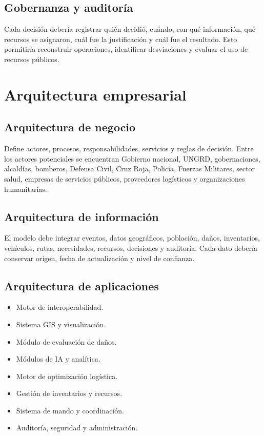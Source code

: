 \documentclass[11pt,a4paper]{article}
\begin{document}
\subsection{Gobernanza y auditoría}

Cada decisión debería registrar quién decidió, cuándo, con qué información,
qué recursos se asignaron, cuál fue la justificación y cuál fue el resultado.
Esto permitiría reconstruir operaciones, identificar desviaciones y evaluar el
uso de recursos públicos.

\section{Arquitectura empresarial}

\subsection{Arquitectura de negocio}

Define actores, procesos, responsabilidades, servicios y reglas de decisión.
Entre los actores potenciales se encuentran Gobierno nacional, UNGRD,
gobernaciones, alcaldías, bomberos, Defensa Civil, Cruz Roja, Policía, Fuerzas
Militares, sector salud, empresas de servicios públicos, proveedores
logísticos y organizaciones humanitarias.

\subsection{Arquitectura de información}

El modelo debe integrar eventos, datos geográficos, población, daños,
inventarios, vehículos, rutas, necesidades, recursos, decisiones y auditoría.
Cada dato debería conservar origen, fecha de actualización y nivel de
confianza.

\subsection{Arquitectura de aplicaciones}

\begin{itemize}[leftmargin=*]
  \item Motor de interoperabilidad.
  \item Sistema GIS y visualización.
  \item Módulo de evaluación de daños.
  \item Módulos de IA y analítica.
  \item Motor de optimización logística.
  \item Gestión de inventarios y recursos.
  \item Sistema de mando y coordinación.
  \item Auditoría, seguridad y administración.
\end{itemize}
\end{document}
